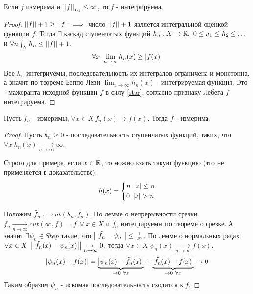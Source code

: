 \begin{statement*}
    Если $f$ измерима и $\left| \left|  f \right| \right|_{L_1} \le \infty$, то $f$ - интегрируема.
    \begin{proof}
        $\left| \left|  f \right| \right| + 1 \ge \left| \left|  f \right| \right| \implies$ число $\left| \left|  f \right| \right|+1$ является интегральной оценкой функции $f$. Тогда $\exists$ каскад ступенчатых функций $h_n: X \to \mathbb{R}, \ 0 \le h_1 \le h_2 \le \hdots$ и $\forall n \int_X h_n \le \left| \left|  f \right| \right|+1$.
        \begin{equation}
            \label{star}
            \forall x \ \lim_{n \to \infty} h_n(x) \ge \left| f(x) \right|
        \end{equation}
        Все $h_n$ интегриуемы, последовательность их интегралов ограничена и монотонна, а значит по теореме Беппо Леви $\lim_{n \to \infty} h_n(x)$ - интегрируемая функция. Это - мажоранта исходной функции $f$ в силу \eqref{star}, согласно признаку Лебега $f$ интегрируема.
    \end{proof}
\end{statement*}

\begin{theorem*}
    Пусть $f_n$ - измеримы, $\vee x \in X \ f_n(x) \to f(x)$. Тогда $f$ - измерима.
    \begin{proof}
        Пусть $h_n \ge 0$ - последовательность ступенчатых функций, таких, что \newline $\forall x \ h_n(x) \underset{n \to \infty}{\to} \infty$.
        
        Строго для примера, если $x \in \mathbb{R}$, то можно взять такую функцию (это не применяется в доказательстве):
        \[h(x) = \begin{cases*}
            n \ \abs{x} \le n \\
            0 \ \abs{x} > n
        \end{cases*}\]
        
        Положим $\tilde{f_n}:= cut(h_n, f_n)$. По лемме о непрерывности срезки $\tilde{f_n} \underset{n \to \infty}{\to} cut(\infty, f) = f \ \vee x \in X$ и $\tilde{f_n}$ интегрируемы по теореме о срезке. 
        А значит $\exists \psi_n \in Step$ такие, что $\left| \left|  \tilde{f_n} - \psi_n \right| \right| \le \frac{1}{2^n}$. По лемме о нормальных рядах $\vee x \in X \ \left| \left|  \tilde{f_n}(x) - \psi_n(x) \right| \right| \underset{n \to \infty}{\to} 0$, тогда $\vee x \in X \ \psi_n(x) \underset{n \to \infty}{\to} f(x)$.
        \[\left| \psi_n(x) - f(x) \right| = \underbrace{\left| \psi_n(x) - \tilde{f_n}(x) \right|}_{\to 0 \ \forall x} + \underbrace{\left| \tilde{f_n}(x) - f(x) \right|}_{\to 0 \ \forall x} \to 0 \]
        Таким образом $\psi_n$ - искомая последовательность сходится к $f$.
    \end{proof}
\end{theorem*}

